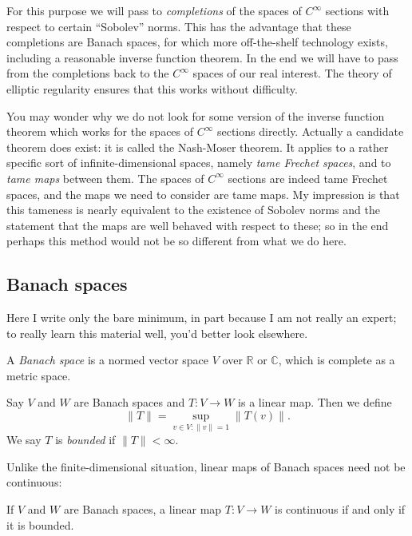 \documentclass[12pt,letterpaper,reqno]{article}
\numberwithin{equation}{section}
\newcommand{\R}{\ensuremath{\mathbb R}}
\newcommand{\C}{\ensuremath{\mathbb C}}
\newcommand{\norm}[1]{\lVert#1\rVert}
\newcommand{\ti}[1]{\textit{#1}}
\newcommand{\fixme}[1]{{\color{orange}{[#1]}}}
\begin{document}
For this purpose we will pass to \ti{completions}
of the spaces of $C^\infty$ sections with
respect to certain ``Sobolev'' norms.
This has the advantage that these completions are Banach spaces, for which
more off-the-shelf technology exists, including a
reasonable inverse function theorem. In the end we will have to
pass from the completions back to the $C^\infty$ spaces of
our real interest. The theory of elliptic regularity ensures
that this works without difficulty.

You may wonder why we do not look for some version
of the inverse function theorem which works for the spaces of
$C^\infty$ sections directly. Actually a candidate theorem
does exist: it is called the Nash-Moser theorem. It applies
to a rather specific sort of infinite-dimensional spaces,
namely \ti{tame Frechet spaces}, and to \ti{tame maps} between them.
The spaces of $C^\infty$ sections are indeed tame Frechet spaces,
and the maps we need to consider are tame maps.
My impression is that this tameness is nearly equivalent to
the existence of Sobolev norms and the statement that the maps
are well behaved with respect to these; so in the end perhaps
this method would not be so different from what we do here.


\subsection{Banach spaces}

Here I write only the bare minimum, in part because
I am not really an expert; to really learn this material
well, you'd better look elsewhere. \fixme{provide some refs}

\begin{defn} A \ti{Banach space} is
a normed vector space $V$ over $\R$ or $\C$, which
is complete as a metric space.
\end{defn}

\begin{defn} Say $V$ and $W$ are Banach
spaces and $T: V \to W$ is a linear map. Then we define
\begin{equation}
  \norm{T} = \sup_{v \in V: \norm{v}=1} \norm{T(v)}.
\end{equation}
We say $T$ is \ti{bounded} if $\norm{T} < \infty$.
\end{defn}

Unlike the finite-dimensional situation, linear maps
of Banach spaces need not be continuous:

\begin{prop}[Continuous = bounded] If $V$ and $W$ are Banach spaces, 
a linear map $T: V \to W$ is continuous if and only if it is bounded.
\end{prop}
\end{document}
